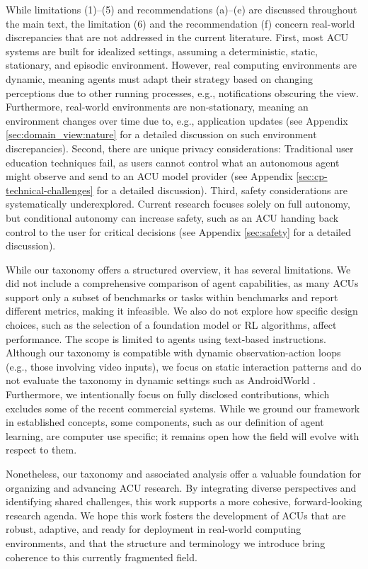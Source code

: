 While limitations (1)–(5) and recommendations (a)–(e) are discussed throughout the main text, the limitation (6) and the recommendation (f) concern real-world discrepancies that are not addressed in the current literature.
First, most ACU systems are built for idealized settings, assuming a deterministic, static, stationary, and episodic environment. 
However, real computing environments are dynamic, meaning agents must adapt their strategy based on changing perceptions due to other running processes, e.g., notifications obscuring the view. Furthermore, real-world environments are non-stationary, meaning an environment changes over time due to, e.g., application updates (see Appendix \cref{sec:domain_view:nature} for a detailed discussion on such environment discrepancies).
Second, there are unique privacy considerations: Traditional user education techniques fail, as users cannot control what an autonomous agent might observe and send to an ACU model provider (see Appendix \cref{sec:cp-technical-challenges} for a detailed discussion).
Third, safety considerations are systematically underexplored.
Current research focuses solely on full autonomy, but conditional autonomy can increase safety, such as an ACU handing back control to the user for critical decisions (see Appendix \cref{sec:safety} for a detailed discussion).

While our taxonomy offers a structured overview, it has several limitations. We did not include a comprehensive comparison of agent capabilities, as many ACUs support only a subset of benchmarks or tasks within benchmarks and report different metrics, making it infeasible. We also do not explore how specific design choices, such as the selection of a foundation model or RL algorithms, affect performance. The scope is limited to agents using text-based instructions. Although our taxonomy is compatible with dynamic observation-action loops (e.g., those involving video inputs), we focus on static interaction patterns and do not evaluate the taxonomy in dynamic settings such as AndroidWorld \citep{rawles_androidworld_2024}. Furthermore, we intentionally focus on fully disclosed contributions, which excludes some of the recent commercial systems. While we ground our framework in established concepts, some components, such as our definition of agent learning, are computer use specific; it remains open how the field will evolve with respect to them.

Nonetheless, our taxonomy and associated analysis offer a valuable foundation for organizing and advancing ACU research. By integrating diverse perspectives and identifying shared challenges, this work supports a more cohesive, forward-looking research agenda. We hope this work fosters the development of ACUs that are robust, adaptive, and ready for deployment in real-world computing environments, and that the structure and terminology we introduce bring coherence to this currently fragmented field.
